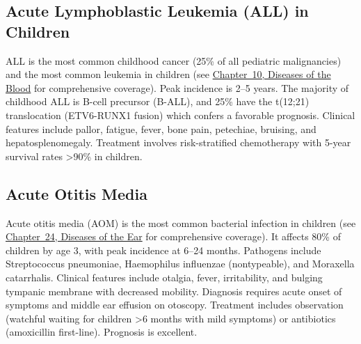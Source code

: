 




\label{sec:Prematurity and Its Complications}

\subsection{Acute Lymphoblastic Leukemia (ALL) in Children}
\label{sec:Acute Lymphoblastic Leukemia in Children}
ALL is the most common childhood cancer (25\% of all pediatric malignancies) and the most common leukemia in children (see \hyperref[ch:blood]{Chapter~10, Diseases of the Blood} for comprehensive coverage). Peak incidence is 2--5 years. The majority of childhood ALL is B-cell precursor (B-ALL), and 25\% have the t(12;21) translocation (ETV6-RUNX1 fusion) which confers a favorable prognosis. Clinical features include pallor, fatigue, fever, bone pain, petechiae, bruising, and hepatosplenomegaly. Treatment involves risk-stratified chemotherapy with 5-year survival rates >90\% in children.

\subsection{Acute Otitis Media}
\label{sec:Acute Otitis Media in Children}
Acute otitis media (AOM) is the most common bacterial infection in children (see \hyperref[ch:ears]{Chapter~24, Diseases of the Ear} for comprehensive coverage). It affects 80\% of children by age 3, with peak incidence at 6--24 months. Pathogens include Streptococcus pneumoniae, Haemophilus influenzae (nontypeable), and Moraxella catarrhalis. Clinical features include otalgia, fever, irritability, and bulging tympanic membrane with decreased mobility. Diagnosis requires acute onset of symptoms and middle ear effusion on otoscopy. Treatment includes observation (watchful waiting for children >6 months with mild symptoms) or antibiotics (amoxicillin first-line). Prognosis is excellent.

